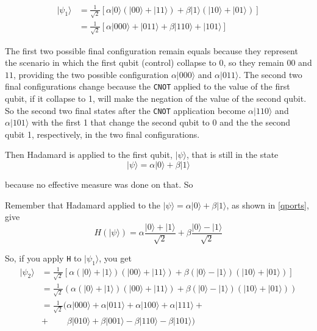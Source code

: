 \documentclass[a4paper,10pt]{article}
\begin{document}
\begin{equation*}
\begin{split}
|\psi_1\rangle & = \frac{1}{\sqrt{2}}\left[\alpha|0\rangle \left(|00\rangle + |11\rangle\right) + \beta|1\rangle \left(|10\rangle + |01\rangle\right) \right] \\
 & = \frac{1}{\sqrt{2}}\left[\alpha|000\rangle + |011\rangle + \beta|110\rangle + |101\rangle\right]
\end{split}
\end{equation*}

The first two possible final configuration remain equals because they represent the scenario in which the first qubit (control) collapse to $0$, so they remain $00$ and $11$, providing the two possible configuration $\alpha|000\rangle$ and $\alpha|011\rangle$. The second two final configurations change because the \texttt{CNOT} applied to the value of the first qubit, if it collapse to 1, will make the negation of the value of the second qubit. So the second two final states after the \texttt{CNOT} application become $\alpha|110\rangle$ and $\alpha|101\rangle$ with the first 1 that change the second qubit to 0 and the the second qubit 1, respectively, in the two final configurations.

Then Hadamard is applied to the first qubit, $|\psi\rangle$, that is still in the state $$|\psi\rangle = \alpha|0\rangle + \beta|1\rangle$$

because no effective measure was done on that. So 

Remember that Hadamard applied to the $|\psi\rangle = \alpha|0\rangle + \beta|1\rangle$, as shown in \autoref{qports}, give
\begin{equation*}
H(|\psi\rangle) = \alpha\frac{|0\rangle + |1\rangle}{\sqrt{2}} + \beta\frac{|0\rangle - |1\rangle}{\sqrt{2}}
\end{equation*}

So, if you apply \texttt{H} to $|\psi_1\rangle$, you get
\begin{equation*}
\begin{split}
|\psi_2\rangle & = \frac{1}{\sqrt{2}}\left[\alpha(|0\rangle + |1\rangle) \left(|00\rangle + |11\rangle\right) + \beta(|0\rangle - |1\rangle) \left(|10\rangle + |01\rangle\right) \right] \\
 & = \frac{1}{\sqrt{2}}(\alpha(|0\rangle + |1\rangle) \left(|00\rangle + |11\rangle\right) + \beta(|0\rangle - |1\rangle) \left(|10\rangle + |01\rangle\right)) \\
 & = \frac{1}{\sqrt{2}}(\alpha|000\rangle + \alpha|011\rangle + \alpha|100\rangle + \alpha|111\rangle + \\ 
 & + \; \; \; \; \; \; \; \; \beta|010\rangle + \beta|001\rangle - \beta|110\rangle - \beta|101\rangle) \\
\end{split}
\end{equation*}
\end{document}
